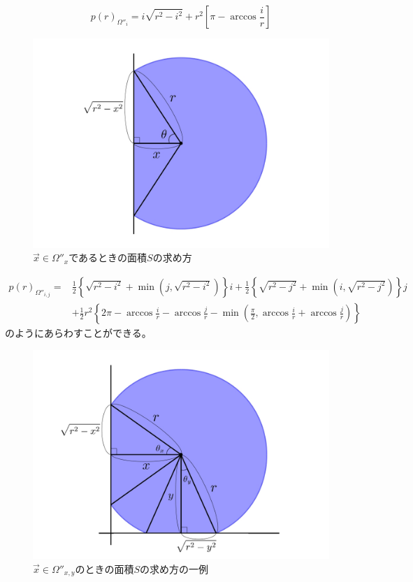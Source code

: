 $$p(r)_{\Omega''_{i}} = i \sqrt{r^{2}-i^{2}} + r^{2} \left[ \pi -\arccos \frac{i}{r} \right]$$
\begin{figure}[H]
    \begin{center}
        \includegraphics[width=12.5cm]{../img/omega_x.jpg}
        \caption{$\vec{x} \in \Omega''_{x}$であるときの面積$S$の求め方}
        \label{fig:f21}
    \end{center}
\end{figure}
\begin{align}p(r)_{\Omega''_{i,j}} = &\frac{1}{2}\left\{ \sqrt{r^{2}-i^{2}} + \min \left(j, \sqrt{r^{2}-i^{2}}\right) \right\}i + \frac{1}{2}\left\{ \sqrt{r^{2}-j^{2}} + \min \left( i, \sqrt{r^{2}-j^{2}}\right) \right\}j \nonumber \\
&+ \frac{1}{2}r^{2} \left\{ 2\pi -\arccos \frac{i}{r}-\arccos \frac{j}{r}-\min \left( \frac{\pi}{2}, \arccos \frac{i}{r} +\arccos \frac{j}{r} \right) \right\}
\end{align}
のようにあらわすことができる。
\begin{figure}[H]
    \begin{center}
        \includegraphics[width=12.5cm]{../img/omega_xy.jpg}
        \caption{$\vec{x} \in \Omega''_{x,y}$のときの面積$S$の求め方の一例}
        \label{fig:f22}
    \end{center}
\end{figure}

